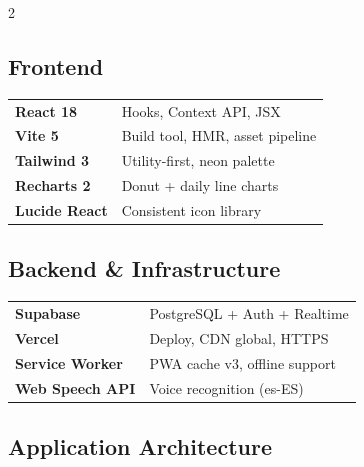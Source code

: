\documentclass[a4paper,10pt]{article}
\begin{document}
\vspace{6pt}

\begin{multicols}{2}
\subsection{Frontend}

{\small
\begin{tabular}{@{}ll@{}}
  {\color{ngreen}\bfseries React 18}     & Hooks, Context API, JSX \\
  {\color{ngreen}\bfseries Vite 5}       & Build tool, HMR, asset pipeline \\
  {\color{ngreen}\bfseries Tailwind 3}   & Utility-first, neon palette \\
  {\color{ngreen}\bfseries Recharts 2}   & Donut + daily line charts \\
  {\color{ngreen}\bfseries Lucide React} & Consistent icon library \\
\end{tabular}
}

\columnbreak

\subsection{Backend \& Infrastructure}

{\small
\begin{tabular}{@{}ll@{}}
  {\color{ncyan}\bfseries Supabase}      & PostgreSQL + Auth + Realtime \\
  {\color{ncyan}\bfseries Vercel}        & Deploy, CDN global, HTTPS \\
  {\color{ncyan}\bfseries Service Worker}& PWA cache v3, offline support \\
  {\color{ncyan}\bfseries Web Speech API}& Voice recognition (es-ES) \\
\end{tabular}
}
\end{multicols}

\vspace{6pt}

\subsection{Application Architecture}
\end{document}
